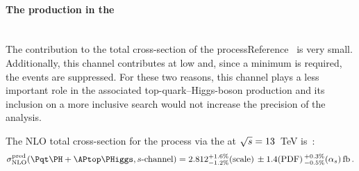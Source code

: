 




\paragraph{The \tH production in the \schannel}\mbox{}\\

The \schannel contribution to the total cross-section of the \tH processReference~
is very small. Additionally, this channel contributes at low \pT and,
since a minimum \pT is required, the \schannel events are suppressed.
For these two reasons, this channel plays a less important role in the
associated top-quark--Higgs-boson production and its inclusion
on a more inclusive \tH search would not increase the precision
of the analysis. 

 The NLO total cross-section for the 
\tH process via the \schannel at $\sqrt{s}=13$~TeV is~\cite{Demartin:2015uha}:
\begin{equation*}
	\sigma_{\text{NLO}}^{\text{pred}} (\tH + \APtop\PHiggs, \schannel) = 2.812^{+1.6\%}_{-1.2\%}\text{(scale)}\,\pm 1.4 \text{(PDF)}\,^{+0.3\%}_{-0.5\%}(\alpha_{s})\,\text{fb}\,.
\end{equation*}



